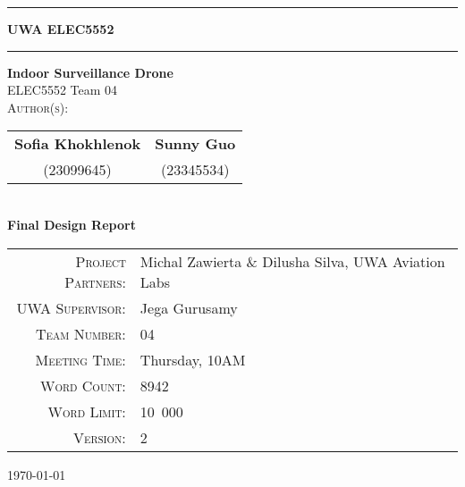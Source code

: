 \begin{titlepage}

\noindent\rule{\textwidth}{0.5pt}
\begin{flushright}
    \textbf{UWA ELEC5552}
\end{flushright}
\rule{\textwidth}{0.5pt}

\vspace{2cm}

\thispagestyle{empty}

\begin{center}
    {\Huge \textbf{Indoor Surveillance Drone}} \\[0.75cm]
    {\Large ELEC5552 Team 04} \\[1.5cm]

    \textsc{Author(s):} \\[0.5cm]

    \begin{tabular}{@{}c@{\hskip 1cm}c@{}}
        \textbf{Sofia Khokhlenok} & \textbf{Sunny Guo} \\[0.2cm]
        (23099645) & (23345534) \\
    \end{tabular} \\[1.5cm]

    {\Large \textbf{Final Design Report}} \\[0.5cm]
\end{center}

\vspace{1.5cm}

\begin{center}
\begin{tabular}{rl}
\textsc{Project Partners:} & Michal Zawierta \& Dilusha Silva, UWA Aviation Labs \\
\textsc{UWA Supervisor:} & Jega Gurusamy \\
\textsc{Team Number:} & 04 \\
\textsc{Meeting Time:} & Thursday, 10AM \\
\textsc{Word Count:} & 8942 \\
\textsc{Word Limit:} & 10~000 \\
\textsc{Version:} & 2 \\
\end{tabular}
\end{center}

\vfill

\begin{center}
    \large \today
\end{center}

\end{titlepage}
